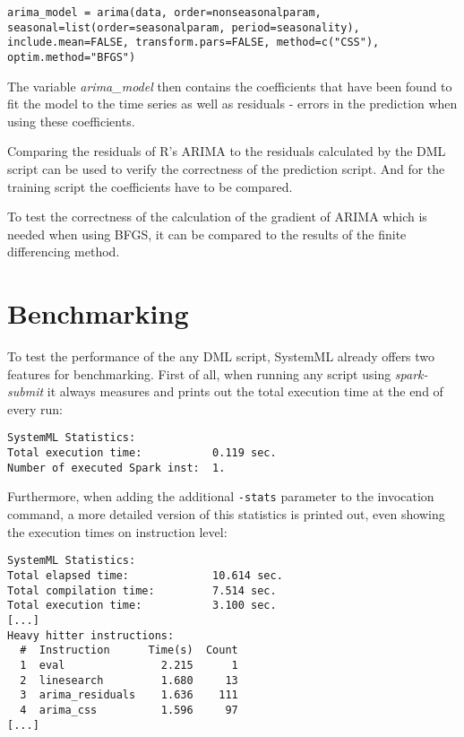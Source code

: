 \begin{lstlisting}[caption=ARIMA model trianing invocation in R,captionpos=b]
arima_model = arima(data, order=nonseasonalparam,  seasonal=list(order=seasonalparam, period=seasonality), include.mean=FALSE, transform.pars=FALSE, method=c("CSS"), optim.method="BFGS")
\end{lstlisting}


The variable \textit{arima\_model} then contains the coefficients that have been found to fit the model to the time series as well as residuals - errors in the prediction when using these coefficients.

Comparing the residuals of R's \acs{ARIMA} to the residuals calculated by the DML script can be used to verify the correctness of the prediction script. And for the training script the coefficients have to be compared.

To test the correctness of the calculation of the gradient of \acs{ARIMA} which is needed when using \acs{BFGS}, it can be compared to the results of the finite differencing method.

\section{Benchmarking}
 
To test the performance of the any \acs{DML} script, SystemML already offers two features for benchmarking. First of all, when running any script using \textit{spark-submit} it always measures and prints out the total execution time at the end of every run:
\begin{lstlisting}[caption=SystemML default statistics,captionpos=b]
SystemML Statistics:
Total execution time:           0.119 sec.
Number of executed Spark inst:  1.
\end{lstlisting}

Furthermore, when adding the additional \lstinline{-stats} parameter to the invocation command, a more detailed version of this statistics is printed out, even showing the execution times on instruction level:
\begin{lstlisting}[caption=Excerpt from SystemML's detailed statistics output,captionpos=b]
SystemML Statistics:
Total elapsed time:             10.614 sec.
Total compilation time:         7.514 sec.
Total execution time:           3.100 sec.
[...]
Heavy hitter instructions:
  #  Instruction      Time(s)  Count
  1  eval               2.215      1
  2  linesearch         1.680     13
  3  arima_residuals    1.636    111
  4  arima_css          1.596     97
[...]
\end{lstlisting}
















